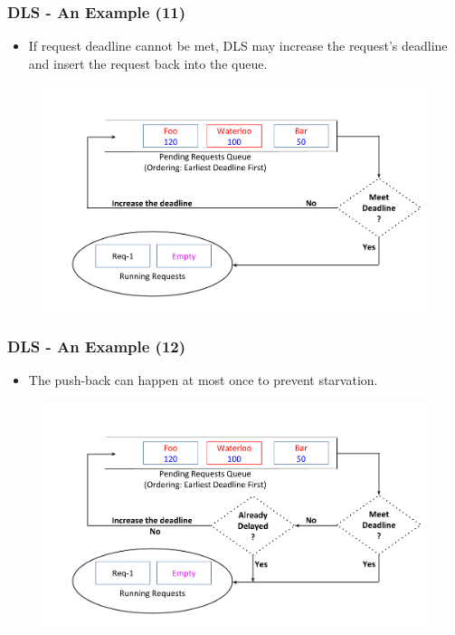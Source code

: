 \documentclass{beamer}
\begin{document}
\begin{frame}
  \frametitle{DLS - An Example (11)}
  \begin{itemize}
  \item If request deadline cannot be met, DLS may increase the request's
    deadline and insert the request back into the queue.
    \newline
  \end{itemize}
  \vspace{-5 mm}
  \begin{figure}
    \begin{center}
      \centerline{\includegraphics[scale=0.33]{img/DLS_Example_ZOOM_5.png}}
    \end{center}
  \end{figure}
\end{frame}


\begin{frame}
  \frametitle{DLS - An Example (12)}
  \begin{itemize}
  \item The push-back can happen at most once to prevent starvation.
    \newline
    \newline
  \end{itemize}
  \vspace{-5 mm}
  \begin{figure}
    \begin{center}
      \centerline{\includegraphics[scale=0.33]{img/DLS_Example_ZOOM_6.png}}
    \end{center}
  \end{figure}
\end{frame}
\end{document}
